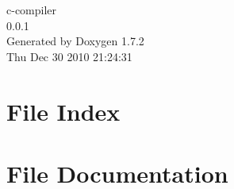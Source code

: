 \documentclass[a4paper]{book}
\begin{document}
\hypersetup{pageanchor=false}
\begin{titlepage}
\vspace*{7cm}
\begin{center}
{\Large c-\/compiler \\[1ex]\large 0.0.1 }\\
\vspace*{1cm}
{\large Generated by Doxygen 1.7.2}\\
\vspace*{0.5cm}
{\small Thu Dec 30 2010 21:24:31}\\
\end{center}
\end{titlepage}
\clearemptydoublepage
{}
\tableofcontents
\clearemptydoublepage
{}
\hypersetup{pageanchor=true}
\chapter{File Index}

\chapter{File Documentation}
















\printindex
\end{document}
